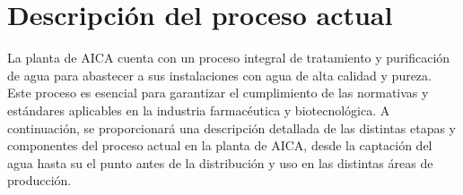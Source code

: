 \section{Descripción del proceso actual}

La planta de AICA cuenta con un proceso integral de tratamiento y purificación de agua para abastecer a sus instalaciones con agua de alta calidad y pureza. Este proceso es esencial para garantizar el cumplimiento de las normativas y estándares aplicables en la industria farmacéutica y biotecnológica. A continuación, se proporcionará una descripción detallada de las distintas etapas y componentes del proceso actual en la planta de AICA, desde la captación del agua hasta su el punto antes de la distribución y uso en las distintas áreas de producción.


